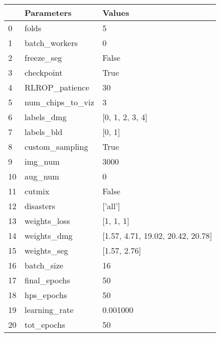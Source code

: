 \begin{tabular}{lll}
\toprule
 & Parameters & Values \\
\midrule
0 & folds & 5 \\
1 & batch_workers & 0 \\
2 & freeze_seg & False \\
3 & checkpoint & True \\
4 & RLROP_patience & 30 \\
5 & num_chips_to_viz & 3 \\
6 & labels_dmg & [0, 1, 2, 3, 4] \\
7 & labels_bld & [0, 1] \\
8 & custom_sampling & True \\
9 & img_num & 3000 \\
10 & aug_num & 0 \\
11 & cutmix & False \\
12 & disasters & ['all'] \\
13 & weights_loss & [1, 1, 1] \\
14 & weights_dmg & [1.57, 4.71, 19.02, 20.42, 20.78] \\
15 & weights_seg & [1.57, 2.76] \\
16 & batch_size & 16 \\
17 & final_epochs & 50 \\
18 & hps_epochs & 50 \\
19 & learning_rate & 0.001000 \\
20 & tot_epochs & 50 \\
\bottomrule
\end{tabular}
